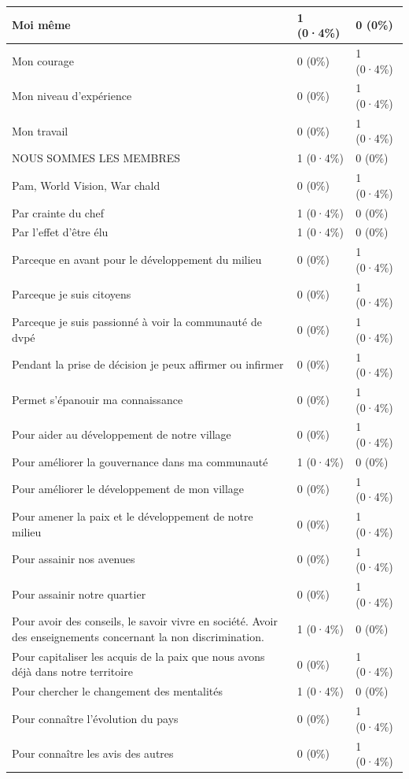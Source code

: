 \documentclass[
]{book}
\begin{document}
\begin{tabular}{l|l|l}
\hline
Moi même & 1 (0·4\%) & 0 (0\%)\\
\hline
Mon courage & 0 (0\%) & 1 (0·4\%)\\
\hline
Mon niveau d'expérience & 0 (0\%) & 1 (0·4\%)\\
\hline
Mon travail & 0 (0\%) & 1 (0·4\%)\\
\hline
NOUS SOMMES LES MEMBRES & 1 (0·4\%) & 0 (0\%)\\
\hline
Pam, World Vision, War chald & 0 (0\%) & 1 (0·4\%)\\
\hline
Par crainte du chef & 1 (0·4\%) & 0 (0\%)\\
\hline
Par l'effet d'être élu & 1 (0·4\%) & 0 (0\%)\\
\hline
Parceque en avant pour le développement du milieu & 0 (0\%) & 1 (0·4\%)\\
\hline
Parceque je suis citoyens & 0 (0\%) & 1 (0·4\%)\\
\hline
Parceque je suis passionné à voir la communauté de dvpé & 0 (0\%) & 1 (0·4\%)\\
\hline
Pendant la prise de décision je peux affirmer ou infirmer & 0 (0\%) & 1 (0·4\%)\\
\hline
Permet s'épanouir ma connaissance & 0 (0\%) & 1 (0·4\%)\\
\hline
Pour aider au développement de notre village & 0 (0\%) & 1 (0·4\%)\\
\hline
Pour améliorer la gouvernance dans ma communauté & 1 (0·4\%) & 0 (0\%)\\
\hline
Pour améliorer le développement de mon village & 0 (0\%) & 1 (0·4\%)\\
\hline
Pour amener la paix et le développement de notre milieu & 0 (0\%) & 1 (0·4\%)\\
\hline
Pour assainir nos avenues & 0 (0\%) & 1 (0·4\%)\\
\hline
Pour assainir notre quartier & 0 (0\%) & 1 (0·4\%)\\
\hline
Pour avoir des conseils, le savoir vivre en société. Avoir  des enseignements concernant la non discrimination. & 1 (0·4\%) & 0 (0\%)\\
\hline
Pour capitaliser les acquis de la  paix que nous avons déjà dans notre territoire & 0 (0\%) & 1 (0·4\%)\\
\hline
Pour chercher le changement des mentalités & 1 (0·4\%) & 0 (0\%)\\
\hline
Pour connaître l'évolution du pays & 0 (0\%) & 1 (0·4\%)\\
\hline
Pour connaître les avis des autres & 0 (0\%) & 1 (0·4\%)\\

\end{tabular}
\end{document}
